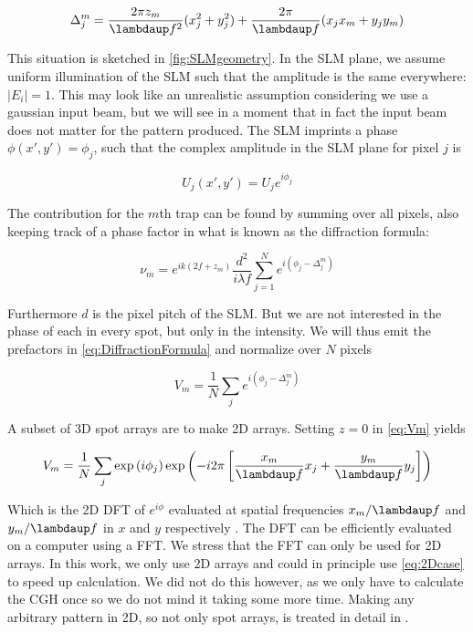 \begin{equation}\label{eq:PropagationPhase}
    \Delta_j^m = \frac{2\pi z_m}{\lambdaup f^2}(x_j^2+y_j^2)+\frac{2\pi}{\lambdaup f}(x_j x_m +y_j y_m)
\end{equation}

This situation is sketched in \cref{fig:SLMgeometry}.
In the SLM plane, we assume uniform illumination of the SLM such that the amplitude is the same everywhere: $|E_i| = 1$.
This may look like an unrealistic assumption considering we use a gaussian input beam, but we will see in a moment that in fact the input beam does not matter for the pattern produced. 
The SLM imprints a phase $\phi(x',y') = \phi_j$, such that the complex amplitude in the SLM plane for pixel $j$ is

\begin{equation}
    U_j(x',y') = U_j e^{i \phi_j}
\end{equation}

The contribution for the $m$th trap can be found by summing over all pixels, also keeping track of a phase factor in what is known as the diffraction formula:

\begin{equation}\label{eq:DiffractionFormula}
    \nu_m = e^{i k \left(2 f + z_m\right)}
    \frac{d^2}{i \lambda f} \sum_{j=1}^N e^{i(\phi_j - \Delta_j^m)}
\end{equation}

Furthermore $d$ is the pixel pitch of the SLM. 
But we are not interested in the phase of each in every spot, but only in the intensity. 
We will thus emit the prefactors in \cref{eq:DiffractionFormula} and normalize over $N$ pixels

\begin{equation}\label{eq:Vm}
    V_m = \frac{1}{N} \sum_{j} e^{i(\phi_j - \Delta_j^m)}
\end{equation}

A subset of 3D spot arrays are to make 2D arrays. 
Setting $z=0$ in \cref{eq:Vm} yields 

\begin{equation}\label{eq:2Dcase}
    V_m = \frac{1}{N} \sum_j \exp{\left(i\phi_j\right)} \exp{\left(
    - i 2\pi \left[
    \frac{x_m}{\lambdaup f} x_j + \frac{y_m}{\lambdaup f} y_j
    \right]
    \right)}
\end{equation}

Which is the 2D \ac{DFT} of $e^{i\phi}$ evaluated at spatial frequencies $x_m/\lambdaup f$ and $y_m/\lambdaup f$ in $x$ and $y$ respectively \cite{DiLeonardo2007,Bijnen2015}. 
The DFT can be efficiently evaluated on a computer using a \ac{FFT}. We stress that the FFT can only be used for 2D arrays. 
In this work, we only use 2D arrays and could in principle use \cref{eq:2Dcase} to speed up calculation. 
We did not do this however, as we only have to calculate the \ac{CGH} once so we do not mind it taking some more time.
Making any arbitrary pattern in 2D, so not only spot arrays, is treated in detail in \cite{Bijnen2013}.  

